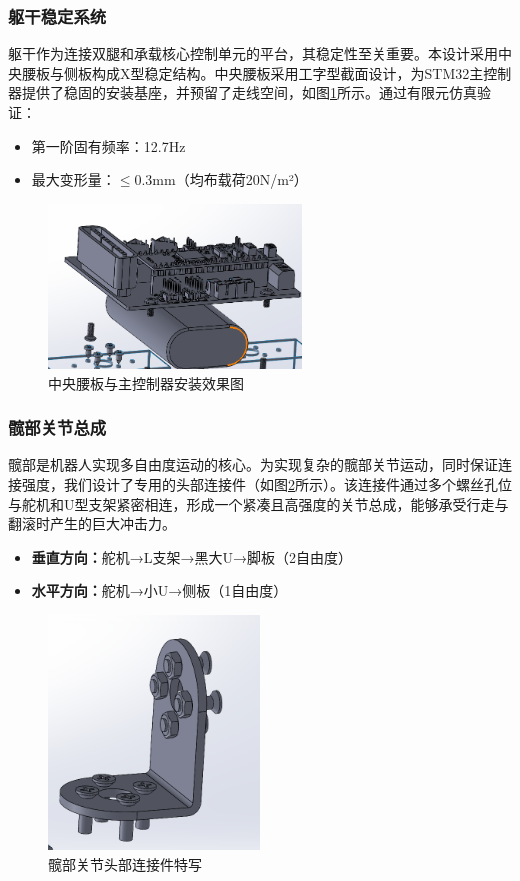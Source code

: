\documentclass[a4paper,fontset=windows]{ctexart}
\providecommand{\tightlist}{%
  \setlength{\itemsep}{0pt}\setlength{\parskip}{0pt}}
\begin{document}
\subsubsection{躯干稳定系统}
躯干作为连接双腿和承载核心控制单元的平台，其稳定性至关重要。本设计采用中央腰板与侧板构成X型稳定结构。中央腰板采用工字型截面设计，为STM32主控制器提供了稳固的安装基座，并预留了走线空间，如图\ref{fig:mcu_mount}所示。通过有限元仿真验证：
\begin{itemize}
    \tightlist
    \item 第一阶固有频率：12.7Hz
    \item 最大变形量：$\leq$0.3mm（均布载荷20N/m²）
\end{itemize}

\begin{figure}[H]
    \centering
    \includegraphics[width=0.6\textwidth]{单片机控制器部分效果图.png}
    \caption{中央腰板与主控制器安装效果图}
    \label{fig:mcu_mount}
\end{figure}

\subsubsection{髋部关节总成}
髋部是机器人实现多自由度运动的核心。为实现复杂的髋部关节运动，同时保证连接强度，我们设计了专用的头部连接件（如图\ref{fig:hip_connector}所示）。该连接件通过多个螺丝孔位与舵机和U型支架紧密相连，形成一个紧凑且高强度的关节总成，能够承受行走与翻滚时产生的巨大冲击力。
\begin{itemize}
    \tightlist
    \item \textbf{垂直方向：}舵机→L支架→黑大U→脚板（2自由度）
    \item \textbf{水平方向：}舵机→小U→侧板（1自由度）
\end{itemize}
\begin{figure}[H]
    \centering
    \includegraphics[width=0.5\textwidth]{头部连接件.png}
    \caption{髋部关节头部连接件特写}
    \label{fig:hip_connector}
\end{figure}
\end{document}

